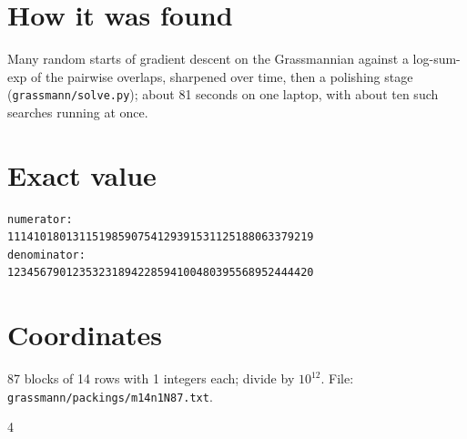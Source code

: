 \documentclass[11pt,a4paper]{article}
\begin{document}
\section{How it was found}
Many random starts of gradient descent on the Grassmannian against a log-sum-exp of the pairwise overlaps, sharpened over time, then a polishing stage (\texttt{grassmann/solve.py}); about 81 seconds on one laptop, with about ten such searches running at once.


\appendix
\section{Exact value}
{\small
\begin{verbatim}
numerator:
11141018013115198590754129391531125188063379219
denominator:
12345679012353231894228594100480395568952444420
\end{verbatim}}

\section{Coordinates}
87 blocks of 14 rows with 1 integers each; divide by $10^{12}$. File: \texttt{grassmann/packings/m14n1N87.txt}.
{\tiny
\begin{multicols}{4}
\end{multicols}}
\end{document}
